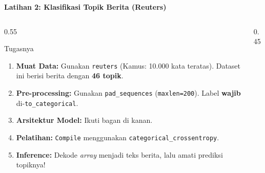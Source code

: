 \documentclass{beamer}
\begin{document}
\begin{frame}{\textbf{Latihan 2: Klasifikasi Topik Berita (Reuters)}}
    
    \begin{columns}[c] 
        
        \begin{column}{0.55\textwidth}
            \begin{alertblock}{Tugasnya}
                \small 
                \begin{enumerate}
                    \setlength{\itemsep}{0.1cm} 
                    \item \textbf{Muat Data:} Gunakan \texttt{reuters} (Kamus: 10.000 kata teratas). Dataset ini berisi berita dengan \textbf{46 topik}.
                    \item \textbf{Pre-processing:} Gunakan \texttt{pad\_sequences} (\texttt{maxlen=200}). Label \textbf{wajib} di-\texttt{to\_categorical}.
                    \item \textbf{Arsitektur Model:} Ikuti bagan di kanan.
                    \item \textbf{Pelatihan:} \texttt{Compile} menggunakan \texttt{categorical\_crossentropy}.
                    \item \textbf{Inference:} Dekode \textit{array} menjadi teks berita, lalu amati prediksi topiknya!
                \end{enumerate}
            \end{alertblock}
        \end{column}
        
        \begin{column}{0.45\textwidth}
            \centering
\end{column}
\end{columns}
\end{frame}
\end{document}
